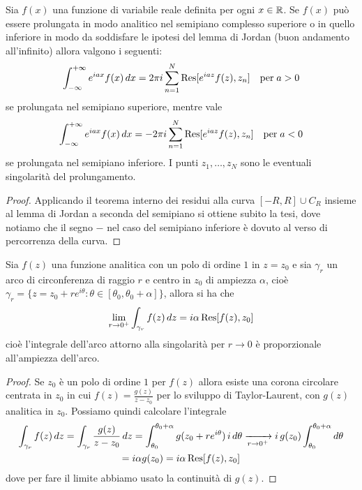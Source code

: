\begin{corollary}
  Sia $ f(x) $ una funzione di variabile reale definita per ogni $ x \in \mathbb{R} $. Se $ f(x) $ può essere prolungata in modo analitico nel semipiano 
  complesso superiore o in quello inferiore in modo da soddisfare le ipotesi del lemma di Jordan (buon andamento all'infinito) allora 
  valgono i seguenti:
  \begin{align}
    \int_{-\infty}^{+\infty} e^{iax} f(x) \, dx = 2\pi i \sum_{n = 1}^{N} \operatorname{\textnormal{Res}}[ e^{iaz} f(z), z_n ] \quad \text{per} \; a > 0
  \end{align}
  se prolungata nel semipiano superiore, mentre vale 
  \begin{align}
    \int_{-\infty}^{+\infty} e^{iax} f(x) \, dx = - 2\pi i \sum_{n = 1}^{N} \operatorname{\textnormal{Res}}[ e^{iaz} f(z), z_n ] \quad \text{per} \; a < 0
  \end{align}
  se prolungata nel semipiano inferiore. I punti $ z_1, \dots, z_N $ sono le eventuali singolarità del prolungamento.
\end{corollary}
\begin{proof}
  Applicando il teorema interno dei residui alla curva $ [-R, R] \cup C_R $ insieme al lemma di Jordan a seconda del semipiano si ottiene subito la tesi, 
  dove notiamo che il segno $ - $ nel caso del semipiano inferiore è dovuto al verso di percorrenza della curva.
\end{proof}

\begin{lemma}
  Sia $ f(z) $ una funzione analitica con un polo di ordine $ 1 $ in $ z = z_0 $ e sia $ \gamma_{r} $ un arco di circonferenza di raggio $ r $ 
  e centro in $ z_0 $ di ampiezza $ \alpha $, cioè $ \gamma_r = \{z = z_ 0 + re^{i\theta} : \theta \in [\theta_0, \theta_0 + \alpha] \} $, allora 
  si ha che 
  \begin{align}
    \lim_{r\to 0^+} \int_{\gamma_r} f(z) \, dz = i \alpha \operatorname{\textnormal{Res}}[ f(z), z_0 ]
  \end{align}
  cioè l'integrale dell'arco attorno alla singolarità per $ r \to 0 $ è proporzionale all'ampiezza dell'arco.
\end{lemma}
\begin{proof}
  Se $ z_0 $ è un polo di ordine $ 1 $ per $ f(z) $ allora esiste una corona circolare centrata in $ z_0 $ in cui $ f(z) = \frac{g(z)}{z - z_0} $ per lo 
  sviluppo di Taylor-Laurent, con $ g(z) $ analitica in $ z_0 $. Possiamo quindi calcolare l'integrale 
  \begin{gather}
    \int_{\gamma_r} f(z)\,dz = \int_{\gamma_r} \frac{g(z)}{z - z_0} \, dz = \int_{\theta_0}^{\theta_0 + \alpha} g(z_0 + r e^{i\theta})\, i \,d\theta
    \xrightarrow[r\to 0^+]{} i \,g(z_0) \int_{\theta_0}^{\theta_0 + \alpha} d\theta 
    \\
    = i \alpha g(z_0) = i \alpha \operatorname{\textnormal{Res}}[ f(z), z_0 ]
  \end{gather}
  dove per fare il limite abbiamo usato la continuità di $ g(z) $.
\end{proof}

